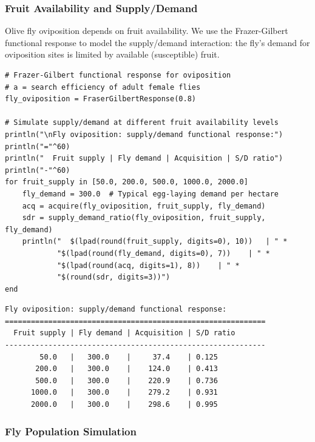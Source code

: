 \subsubsection{Fruit Availability and Supply/Demand}



\label{10252892344132969812}{}


Olive fly oviposition depends on fruit availability. We use the Frazer-Gilbert functional response to model the supply/demand interaction: the fly’s demand for oviposition sites is limited by available (susceptible) fruit.




\begin{verbatim}
# Frazer-Gilbert functional response for oviposition
# a = search efficiency of adult female flies
fly_oviposition = FraserGilbertResponse(0.8)

# Simulate supply/demand at different fruit availability levels
println("\nFly oviposition: supply/demand functional response:")
println("="^60)
println("  Fruit supply | Fly demand | Acquisition | S/D ratio")
println("-"^60)
for fruit_supply in [50.0, 200.0, 500.0, 1000.0, 2000.0]
    fly_demand = 300.0  # Typical egg-laying demand per hectare
    acq = acquire(fly_oviposition, fruit_supply, fly_demand)
    sdr = supply_demand_ratio(fly_oviposition, fruit_supply, fly_demand)
    println("  $(lpad(round(fruit_supply, digits=0), 10))   | " *
            "$(lpad(round(fly_demand, digits=0), 7))    | " *
            "$(lpad(round(acq, digits=1), 8))    | " *
            "$(round(sdr, digits=3))")
end
\end{verbatim}




\begin{verbatim}
Fly oviposition: supply/demand functional response:
============================================================
  Fruit supply | Fly demand | Acquisition | S/D ratio
------------------------------------------------------------
        50.0   |   300.0    |     37.4    | 0.125
       200.0   |   300.0    |    124.0    | 0.413
       500.0   |   300.0    |    220.9    | 0.736
      1000.0   |   300.0    |    279.2    | 0.931
      2000.0   |   300.0    |    298.6    | 0.995
\end{verbatim}



\subsubsection{Fly Population Simulation}



